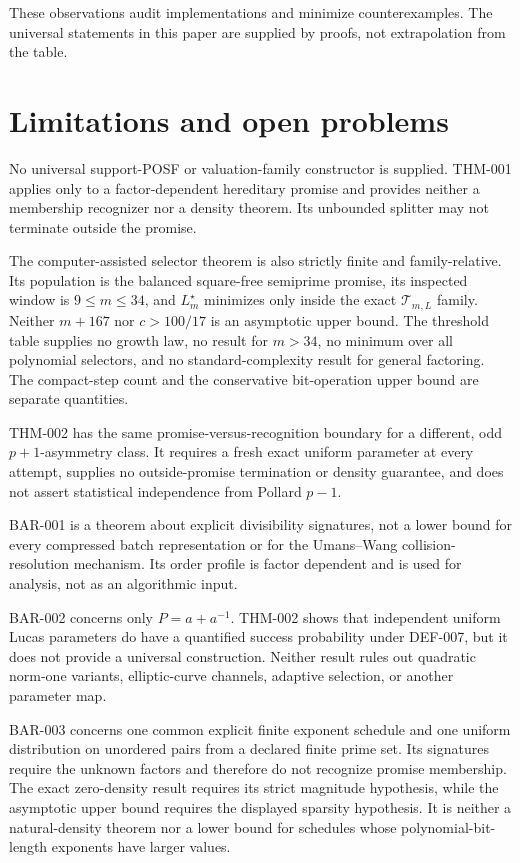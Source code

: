 \documentclass[11pt]{article}
\begin{document}
These observations audit implementations and minimize counterexamples. The
universal statements in this paper are supplied by proofs, not extrapolation
from the table.

\section{Limitations and open problems}

No universal support-POSF or valuation-family constructor is supplied.
THM-001 applies only to a factor-dependent hereditary promise and provides
neither a membership recognizer nor a density theorem. Its unbounded splitter
may not terminate outside the promise.

The computer-assisted selector theorem is also strictly finite and
family-relative. Its population is the balanced square-free semiprime promise,
its inspected window is \(9\le m\le34\), and \(L_m^\star\) minimizes only
inside the exact \(\mathcal T_{m,L}\) family. Neither \(m+167\) nor
\(c>100/17\) is an asymptotic upper bound. The threshold table supplies no
growth law, no result for \(m>34\), no minimum over all polynomial selectors,
and no standard-complexity result for general factoring. The compact-step
count and the conservative bit-operation upper bound are separate quantities.

THM-002 has the same promise-versus-recognition boundary for a different,
odd \(p+1\)-asymmetry class. It requires a fresh exact uniform parameter at
every attempt, supplies no outside-promise termination or density guarantee,
and does not assert statistical independence from Pollard \(p-1\).

BAR-001 is a theorem about explicit divisibility signatures, not a lower bound
for every compressed batch representation or for the Umans--Wang
collision-resolution mechanism. Its order profile is factor dependent and is
used for analysis, not as an algorithmic input.

BAR-002 concerns only \(P=a+a^{-1}\). THM-002 shows that independent uniform
Lucas parameters do have a quantified success probability under DEF-007, but
it does not provide a universal construction. Neither result rules out
quadratic norm-one variants, elliptic-curve channels, adaptive selection, or
another parameter map.

BAR-003 concerns one common explicit finite exponent schedule and one uniform
distribution on unordered pairs from a declared finite prime set. Its
signatures require the unknown factors and therefore do not recognize promise
membership. The exact zero-density result requires its strict magnitude
hypothesis, while the asymptotic upper bound requires the displayed sparsity
hypothesis. It is neither a natural-density theorem nor a lower bound for
schedules whose polynomial-bit-length exponents have larger values.
\end{document}

